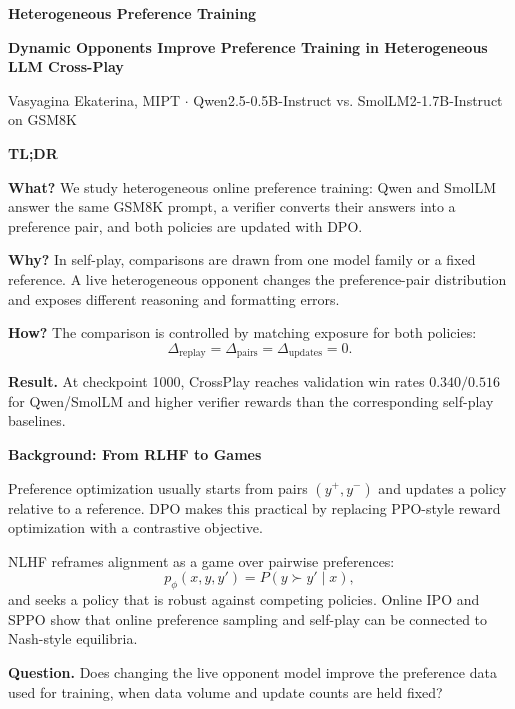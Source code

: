 \documentclass[final]{article}
\newcommand{\BlockTitle}[1]{%
  {\color{dmblue}\fontsize{32}{36}\selectfont\bfseries #1}\par
  \vspace{0.08em}{\color{linegray}\rule{\linewidth}{1.2pt}}\vspace{0.24em}
}
\newcommand{\Key}[1]{{\bfseries #1}}
\newcommand{\Good}[1]{{\color{goodgreen}#1}}
\newcommand{\PosterBlock}[2]{%
  \begin{minipage}[t]{\linewidth}
  \BlockTitle{#1}
  {\fontsize{20.5}{25}\selectfont #2}
  \end{minipage}
}
\begin{document}
\begin{center}
  {\fontsize{31}{35}\selectfont\color{textgray}\bfseries Heterogeneous Preference Training}\par
  \vspace{0.18em}
  {\fontsize{48}{54}\selectfont\color{dmblue}\bfseries Dynamic Opponents Improve Preference Training in Heterogeneous LLM Cross-Play}\par
  \vspace{0.25em}
  {\fontsize{23}{27}\selectfont
  Vasyagina Ekaterina, MIPT \quad $\cdot$ \quad Qwen2.5-0.5B-Instruct vs. SmolLM2-1.7B-Instruct on GSM8K}
\end{center}

\vspace{0.30em}

\begin{minipage}[t]{0.487\linewidth}
\PosterBlock{TL;DR}{
\Key{What?} We study heterogeneous online preference training: Qwen and SmolLM answer the same GSM8K prompt, a verifier converts their answers into a preference pair, and both policies are updated with DPO.

\Key{Why?} In self-play, comparisons are drawn from one model family or a fixed reference. A \Good{live heterogeneous opponent} changes the preference-pair distribution and exposes different reasoning and formatting errors.

\Key{How?} The comparison is controlled by matching exposure for both policies:
\[
\Delta_{\mathrm{replay}}=\Delta_{\mathrm{pairs}}=\Delta_{\mathrm{updates}}=0.
\]

\Key{Result.} At checkpoint 1000, CrossPlay reaches validation win rates $0.340/0.516$ for Qwen/SmolLM and higher verifier rewards than the corresponding self-play baselines.
}

\vspace{0.42em}

\PosterBlock{Background: From RLHF to Games}{
Preference optimization usually starts from pairs $(y^+,y^-)$ and updates a policy relative to a reference. DPO makes this practical by replacing PPO-style reward optimization with a contrastive objective.

NLHF reframes alignment as a game over pairwise preferences:
\[
p_\phi(x,y,y')=P(y\succ y'\mid x),
\]
and seeks a policy that is robust against competing policies. Online IPO and SPPO show that online preference sampling and self-play can be connected to Nash-style equilibria.

\Key{Question.} Does changing the live opponent model improve the preference data used for training, when data volume and update counts are held fixed?
}


\end{minipage}
\end{document}
